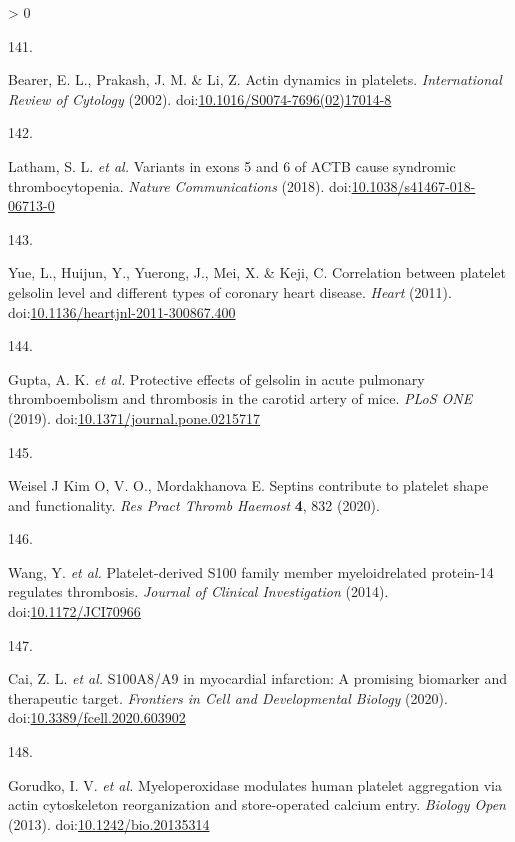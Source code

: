 \documentclass[11pt,twoside]{bristolthesis}
\newlength{\cslhangindent}
\newlength{\csllabelwidth}
\newenvironment{CSLReferences}[2] %
 {%
  \setlength{\parindent}{0pt}
  \ifodd #1 \everypar{\setlength{\hangindent}{\cslhangindent}}\ignorespaces\fi
  \ifnum #2 > 0
  \setlength{\parskip}{#2\baselineskip}
  \fi
 }%
 {}
\newcommand{\CSLLeftMargin}[1]{\parbox[t]{\csllabelwidth}{#1}}
\newcommand{\CSLRightInline}[1]{\parbox[t]{\linewidth - \csllabelwidth}{#1}\break}
\begin{document}
\begin{CSLReferences}{0}{0}
\leavevmode\hypertarget{ref-Bearer2002}{}%
\CSLLeftMargin{141. }
\CSLRightInline{Bearer, E. L., Prakash, J. M. \& Li, Z. Actin dynamics in platelets. \emph{International Review of Cytology} (2002). doi:\href{https://doi.org/10.1016/S0074-7696(02)17014-8}{10.1016/S0074-7696(02)17014-8}}

\leavevmode\hypertarget{ref-Latham2018}{}%
\CSLLeftMargin{142. }
\CSLRightInline{Latham, S. L. \emph{et al.} Variants in exons 5 and 6 of ACTB cause syndromic thrombocytopenia. \emph{Nature Communications} (2018). doi:\href{https://doi.org/10.1038/s41467-018-06713-0}{10.1038/s41467-018-06713-0}}

\leavevmode\hypertarget{ref-Yue2011}{}%
\CSLLeftMargin{143. }
\CSLRightInline{Yue, L., Huijun, Y., Yuerong, J., Mei, X. \& Keji, C. Correlation between platelet gelsolin level and different types of coronary heart disease. \emph{Heart} (2011). doi:\href{https://doi.org/10.1136/heartjnl-2011-300867.400}{10.1136/heartjnl-2011-300867.400}}

\leavevmode\hypertarget{ref-Gupta2019}{}%
\CSLLeftMargin{144. }
\CSLRightInline{Gupta, A. K. \emph{et al.} Protective effects of gelsolin in acute pulmonary thromboembolism and thrombosis in the carotid artery of mice. \emph{PLoS ONE} (2019). doi:\href{https://doi.org/10.1371/journal.pone.0215717}{10.1371/journal.pone.0215717}}

\leavevmode\hypertarget{ref-Kim2020}{}%
\CSLLeftMargin{145. }
\CSLRightInline{Weisel J Kim O, V. O., Mordakhanova E. Septins contribute to platelet shape and functionality. \emph{Res Pract Thromb Haemost} \textbf{4}, 832 (2020).}

\leavevmode\hypertarget{ref-Wang2014a}{}%
\CSLLeftMargin{146. }
\CSLRightInline{Wang, Y. \emph{et al.} Platelet-derived S100 family member myeloidrelated protein-14 regulates thrombosis. \emph{Journal of Clinical Investigation} (2014). doi:\href{https://doi.org/10.1172/JCI70966}{10.1172/JCI70966}}

\leavevmode\hypertarget{ref-Cai2020}{}%
\CSLLeftMargin{147. }
\CSLRightInline{Cai, Z. L. \emph{et al.} S100A8/A9 in myocardial infarction: A promising biomarker and therapeutic target. \emph{Frontiers in Cell and Developmental Biology} (2020). doi:\href{https://doi.org/10.3389/fcell.2020.603902}{10.3389/fcell.2020.603902}}

\leavevmode\hypertarget{ref-Gorudko2013}{}%
\CSLLeftMargin{148. }
\CSLRightInline{Gorudko, I. V. \emph{et al.} Myeloperoxidase modulates human platelet aggregation via actin cytoskeleton reorganization and store-operated calcium entry. \emph{Biology Open} (2013). doi:\href{https://doi.org/10.1242/bio.20135314}{10.1242/bio.20135314}}


\end{CSLReferences}
\end{document}

